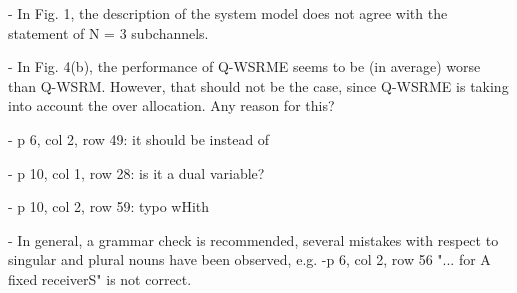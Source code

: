 \begin{enumerate}
\begin{enumerate}
	\resp \review{}
	
	 - {In Fig. 1, the description of the system model does not agree with the statement of N = 3 subchannels.}
	
	\resp \review{}
	
	 - {In Fig. 4(b), the performance of Q-WSRME seems to be (in average) worse than Q-WSRM. However, that should not be the case, since Q-WSRME is taking into account the over allocation. Any reason for this?}
	
	\resp \review{}
	
	 - {p 6, col 2, row 49: it should be  instead of }
	
	\resp \review{}
	
	 - {p 10, col 1, row 28: is it \eqn{\lambda} a dual variable?}
	
	\resp \review{}
	
	 - {p 10, col 2, row 59: typo wHith}
	
	\resp \review{}
	
	 - {In general, a grammar check is recommended, several mistakes with respect to singular and plural nouns have been observed, e.g. -p 6, col 2, row 56 "... for A fixed receiverS" is not correct.}
	
	\resp \review{}
	
\end{enumerate}

\end{enumerate}

